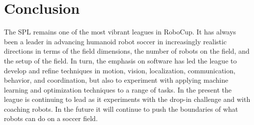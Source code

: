 \documentclass{llncs}
\begin{document}

\section{Conclusion}

The SPL remains one of the most vibrant leagues in RoboCup. It has always been a leader in
advancing humanoid robot soccer in increasingly realistic directions in terms of the field dimensions, the
number of robots on the field, and the setup of the field. In turn, the emphasis on software has
led the league to develop
and refine techniques in motion, vision, localization, communication, behavior, and coordination, but also to experiment with applying machine learning and optimization techniques to a range of tasks. In the present the league is
continuing to lead as it experiments with the drop-in challenge and with coaching robots. In the future
it will continue to push the boundaries of what robots can do on a soccer field.


 
\end{document}
